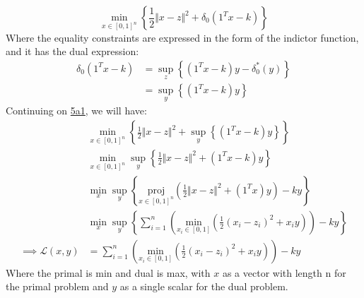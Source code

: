 \documentclass[]{article}
\begin{document}
        \begin{equation*}\tag{5a1}\label{eqn:5a1}
            \min_{x\in [0, 1]^n} \left\lbrace
                \frac{1}{2}\Vert x - z\Vert^2 + \delta_0(1^Tx - k)
            \right\rbrace
        \end{equation*}
        Where the equality constraints are expressed in the form of the indictor function, and it has the dual expression: 
        \begin{align*}\tag{5a2}\label{eqn:5a2}
            \delta_0(1^Tx - k) &= \sup_z \left\lbrace
                (1^Tx - k)y - \delta^*_0(y)
            \right\rbrace
            \\
            & = \sup_y \left\lbrace
                (1^Tx - k)y
            \right\rbrace
        \end{align*}
        Continuing on \hyperref[eqn:5a1]{5a1}, we will have: 
        \begin{align*}\tag{5a3}\label{eqn:5a3}
            &\min_{x\in [0, 1]^n} 
            \left\lbrace
                \frac{1}{2}\Vert x - z\Vert^2 + 
                \sup_y \left\lbrace
                    (1^Tx - k)y
                \right\rbrace
            \right\rbrace
            \\
            &\min_{x\in [0, 1]^n}\sup_y
            \left\lbrace
                \frac{1}{2}\Vert x - z\Vert^2 + 
                    (1^Tx - k)y
            \right\rbrace
            \\
            & \min_x\sup_y
            \left\lbrace
            \underset{x\in[0, 1]^n}{\text{proj}}
                \left(
                    \frac{1}{2}\Vert x - z\Vert^2 + (1^Tx)y 
                \right)
                - ky
            \right\rbrace
            \\
            & \min_x\sup_y
            \left\lbrace
                \sum_{i=1}^{n}\left(
                    \underset{x_i\in [0,1]}{\text{min}}
                    \left(
                        \frac{1}{2}(x_i - z_i)^2 + x_iy
                    \right)
                \right)
                - ky
            \right\rbrace
            \\
            \implies 
            \mathcal{L}(x, y) &= 
            \sum_{i=1}^{n}\left(
                    \underset{x_i\in [0,1]}{\text{min}}
                    \left(
                        \frac{1}{2}(x_i - z_i)^2 + x_iy
                    \right)
                \right)
                - ky
        \end{align*}
        Where the primal is min and dual is max, with $x$ as a vector with length n for the primal problem and $y$ as a single scalar for the dual problem. 
\end{document}
